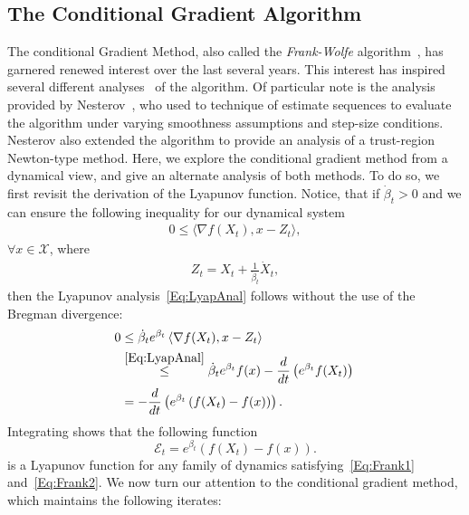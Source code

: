 \documentclass[11pt]{article}
\theoremstyle{plain}
\newcommand{\X}{{\mathcal X}}
\begin{document}
\subsection{The Conditional Gradient Algorithm}
\label{Sec:CondGrad}
 The conditional Gradient Method, also called the {\em Frank-Wolfe} algorithm~\cite{FrankWolfe}, has garnered renewed interest over the last several years. This interest has inspired several different analyses~\cite{Freund14, Bach15} of the algorithm. Of particular note is the analysis provided by Nesterov~\cite{NesterovCond15}, who used to technique of estimate sequences to evaluate the algorithm under varying smoothness assumptions and step-size conditions. Nesterov also extended the algorithm to provide an analysis of a trust-region Newton-type method. Here, we explore the conditional gradient method from a dynamical view, and give an alternate analysis of both methods. To do so, we first revisit the derivation of the Lyapunov function. Notice, that if $\dot \beta_t >0 $ and we can ensure the following inequality for our dynamical system
\begin{align}\label{Eq:Frank1} 
0 \leq \langle \nabla f(X_t), x-  Z_t\rangle,
\end{align}
 $\forall x \in \X $, where 
\begin{align}\label{Eq:Frank2}
Z_t = X_t + \frac{1}{\dot \beta_t} \dot X_t,
\end{align}
then the Lyapunov analysis~\eqref{Eq:LyapAnal} follows without the use of the Bregman divergence: 
\begin{subequations}\label{Eq:LyapAnalFrank}
\begin{align}
0 &\leq  
\dot \beta_t e^{\beta_t} \left\langle \nabla f(X_t), x -Z_t\right\rangle \,  \notag\\
& \overset{\eqref{Eq:LyapAnal}}{\leq}  \dot \beta_t e^{\beta_t} f(x) -\frac{d}{dt}\left( e^{ \beta_t}  f(X_t)\right)\, \notag\\
& = -\frac{d}{dt} \left( e^{\beta_t}\left(f(X_t) - f(x)\right)\right). \notag
\end{align}
\end{subequations}
Integrating shows that the following function 
\begin{equation}\label{Eq:FrankE}
\mathcal{E}_t = e^{\beta_t} (f(X_t) - f(x)).
\end{equation} 
is a Lyapunov function for any family of dynamics satisfying~\eqref{Eq:Frank1} and~\eqref{Eq:Frank2}.  We now turn our attention to the conditional gradient method, which maintains the following iterates: 
\end{document}
